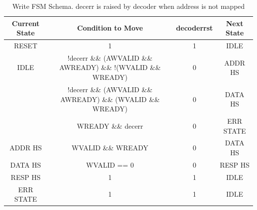 \begin{table} [!h]
  \centering
  \begin{tabular} {c | c | c | c}
    Current State	& Condition to Move &	decoderrst & Next State \\
    \hline
    \hline
    RESET &	1	& 1	& IDLE \\
    \hline
    IDLE & \small {!decerr \&\& (AWVALID \&\& AWREADY) \&\& !(WVALID \&\& WREADY)} &	0	& ADDR HS \\
    & \small{!decerr \&\& (AWVALID \&\& AWREADY) \&\& (WVALID \&\& WREADY)} &	0	& DATA HS \\
    & WREADY \&\& decerr &	0 &	ERR STATE \\
    \hline
    ADDR HS	& WVALID \&\& WREADY &	0	& DATA HS \\
    \hline
    DATA HS	& WVALID == 0 &	0 &	RESP HS \\
    \hline
    RESP HS	& 1 &	1	& IDLE \\
    \hline
    ERR STATE &	1	& 1 &	IDLE \\
    \hline
  \end{tabular}
  \caption{Write FSM Schema. decerr is raised by decoder when address is not mapped}
  \label{writeFSMSchemaTab}
\end{table}
